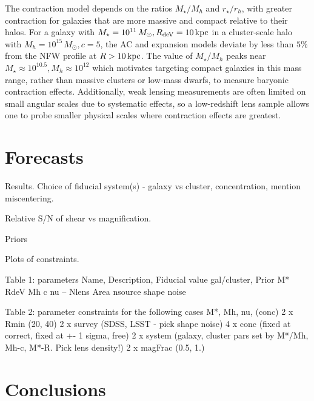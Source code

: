 \documentclass[12pt]{emulateapj}
\begin{document}
The contraction model depends on the ratios $M_{\star}/M_h$ and
$r_{\star}/r_h$, with greater contraction for galaxies that are more
massive and compact relative to their halos. For a galaxy with
$M_{\star}=10^{11}\,M_{\odot}, R_{\rm deV}=10\,{\rm kpc}$ in a
cluster-scale halo with $M_{h}=10^{15}\,M_{\odot}, c=5$, the AC and
expansion models deviate by less than $5\%$ from the NFW profile at
$R>10\,{\rm kpc}$. The value of $M_{\star}/M_{h}$ peaks near
$M_{\star}\approx10^{10.5}, M_h\approx10^{12}$
\citep[e.g.][]{Conroy2009, Behroozi2010, Leauthaud2012} which
motivates targeting compact galaxies in this mass range, rather than
massive clusters or low-mass dwarfs, to measure baryonic contraction
effects. Additionally, weak lensing measurements are often limited on
small angular scales due to systematic effects, so a low-redshift lens
sample allows one to probe smaller physical scales where contraction
effects are greatest.


\section{Forecasts}

Results. Choice of fiducial system(s) - galaxy vs cluster, concentration, mention
miscentering.

Relative S/N of shear vs magnification.

Priors

Plots of constraints.



Table 1: parameters
Name, Description, Fiducial value gal/cluster, Prior
M*
RdeV
Mh
c
nu
--
Nlens
Area
nsource
shape noise


Table 2: parameter constraints for the following cases
M*, Mh, nu, (conc)
2 x Rmin (20, 40)
2 x survey (SDSS, LSST - pick shape noise)
4 x conc (fixed at correct, fixed at +- 1 sigma, free)
2 x system (galaxy, cluster pars set by M*/Mh, Mh-c, M*-R. Pick lens density!)
2 x magFrac (0.5, 1.)

\section{Conclusions}



\acknowledgments 

\mbox{~} %


%



\end{document}
